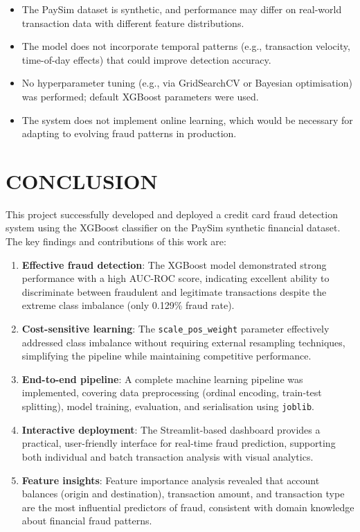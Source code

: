 \documentclass[12pt,a4paper]{report}
\begin{document}
\begin{itemize}
    \item The PaySim dataset is synthetic, and performance may differ on real-world transaction data with different feature distributions.
    \item The model does not incorporate temporal patterns (e.g., transaction velocity, time-of-day effects) that could improve detection accuracy.
    \item No hyperparameter tuning (e.g., via GridSearchCV or Bayesian optimisation) was performed; default XGBoost parameters were used.
    \item The system does not implement online learning, which would be necessary for adapting to evolving fraud patterns in production.
\end{itemize}

\chapter{CONCLUSION}

This project successfully developed and deployed a credit card fraud detection system using the XGBoost classifier on the PaySim synthetic financial dataset. The key findings and contributions of this work are:

\begin{enumerate}
    \item \textbf{Effective fraud detection}: The XGBoost model demonstrated strong performance with a high AUC-ROC score, indicating excellent ability to discriminate between fraudulent and legitimate transactions despite the extreme class imbalance (only 0.129\% fraud rate).
    
    \item \textbf{Cost-sensitive learning}: The \texttt{scale\_pos\_weight} parameter effectively addressed class imbalance without requiring external resampling techniques, simplifying the pipeline while maintaining competitive performance.
    
    \item \textbf{End-to-end pipeline}: A complete machine learning pipeline was implemented, covering data preprocessing (ordinal encoding, train-test splitting), model training, evaluation, and serialisation using \texttt{joblib}.
    
    \item \textbf{Interactive deployment}: The Streamlit-based dashboard provides a practical, user-friendly interface for real-time fraud prediction, supporting both individual and batch transaction analysis with visual analytics.
    
    \item \textbf{Feature insights}: Feature importance analysis revealed that account balances (origin and destination), transaction amount, and transaction type are the most influential predictors of fraud, consistent with domain knowledge about financial fraud patterns.
\end{enumerate}
\end{document}
